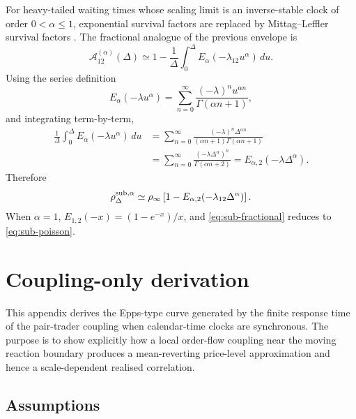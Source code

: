 \documentclass[5p,final]{elsarticle}
\begin{document}
For heavy-tailed waiting times whose scaling limit is an inverse-stable clock of order $0<\alpha\leq1$, exponential survival factors are replaced by Mittag--Leffler survival factors \cite{Haubold2011MittagLeffler}.  The fractional analogue of the previous envelope is
\begin{equation}
\mathcal A_{12}^{(\alpha)}(\Delta)
\simeq
1-\frac{1}{\Delta}\int_0^\Delta E_\alpha(-\lambda_{12}u^\alpha)\,du.
\end{equation}
Using the series definition
\begin{equation}
E_\alpha(-\lambda u^\alpha)=\sum_{n=0}^{\infty}\frac{(-\lambda)^n u^{\alpha n}}{\Gamma(\alpha n+1)},
\end{equation}
and integrating term-by-term,
\begin{align}
\frac{1}{\Delta}\int_0^\Delta E_\alpha(-\lambda u^\alpha)\,du
&=\sum_{n=0}^{\infty}\frac{(-\lambda)^n\Delta^{\alpha n}}{(\alpha n+1)\Gamma(\alpha n+1)}\\
&=\sum_{n=0}^{\infty}\frac{(-\lambda\Delta^\alpha)^n}{\Gamma(\alpha n+2)}
=E_{\alpha,2}(-\lambda\Delta^\alpha).
\end{align}
Therefore
\begin{equation}
\rho^{\rm sub,\alpha}_\Delta
\simeq
\rho_\infty\left[1-E_{\alpha,2}(-\lambda_{12}\Delta^\alpha)\right].
\label{eq:sub-fractional}
\end{equation}
When $\alpha=1$, $E_{1,2}(-x)=(1-e^{-x})/x$, and \eqref{eq:sub-fractional} reduces to \eqref{eq:sub-poisson}.

\section{Coupling-only derivation}\label{app:coupling-only}

This appendix derives the Epps-type curve generated by the finite response time of the pair-trader coupling when calendar-time clocks are synchronous.  The purpose is to show explicitly how a local order-flow coupling near the moving reaction boundary produces a mean-reverting price-level approximation and hence a scale-dependent realised correlation.

\subsection{Assumptions}
\end{document}
